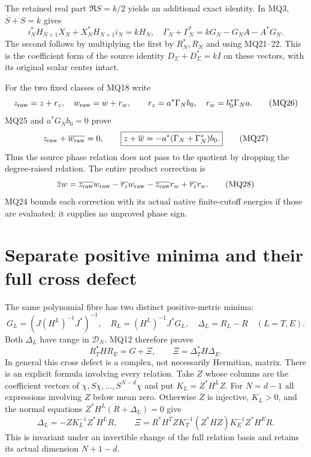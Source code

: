 \documentclass[11pt]{article}
\newcommand{\DD}{\mathcal D}
\begin{document}
The retained real part $\Re S=k/2$ yields an additional exact
identity. In MQ3, $\overline S+S=k$ gives
\[
 i_N^*H_{N+1}X_N+X_N^*H_{N+1}i_N=kH_N,
 \quad
 \boxed{\Gamma_N+\Gamma_N^*=kG_N-G_NA-A^*G_N.}              \tag{MQ25}
\]
The second follows by multiplying the first by $R_N^*,R_N$ and
using MQ21--22. This is the coefficient form of the source identity
$D_\Sigma+D_\Sigma^*=kI$ on these vectors, with its original
scalar center intact.

For the two fixed classes of MQ18 write
\[
 z_{\rm raw}=z+r_z,\quad w_{\rm raw}=w+r_w,\qquad
 r_z=a^*\Gamma_Nb_0,\quad r_w=b_0^*\Gamma_Na.                \tag{MQ26}
\]
MQ25 and $a^*G_Nb_0=0$ prove
\[
 z_{\rm raw}+\overline{w_{\rm raw}}=0,\qquad
 \boxed{z+\overline w=-a^*(\Gamma_N+\Gamma_N^*)b_0.}         \tag{MQ27}
\]
Thus the source phase relation does not pass to the quotient by
dropping the degree-raised relation. The entire product correction is
\[
 \overline zw=\overline{z_{\rm raw}}w_{\rm raw}
     -\overline{r_z}w_{\rm raw}
     -\overline{z_{\rm raw}}r_w+\overline{r_z}r_w.            \tag{MQ28}
\]
MQ24 bounds each correction with its actual native finite-cutoff
energies if those are evaluated; it supplies no unproved phase sign.

\section{Separate positive minima and their full cross defect}
The same polynomial fibre has two distinct positive-metric minima:
\[
 G_L=(J(H^L)^{-1}J^*)^{-1},\quad
 R_L=(H^L)^{-1}J^*G_L,\quad \Delta_L=R_L-R\quad(L=T,E).
                                                               \tag{MQ29}
\]
Both $\Delta_L$ have range in $\DD_N$. MQ12 therefore proves
\[
 R_T^*HR_E=G+\Xi,\qquad
 \boxed{\Xi=\Delta_T^*H\Delta_E.}                           \tag{MQ30}
\]
In general this cross defect is a complex, not necessarily Hermitian,
matrix. There is an explicit formula involving every relation.
Take $Z$ whose columns are the coefficient vectors of
$\chi,S\chi,\ldots,S^{N-d}\chi$ and put $K_L=Z^*H^LZ$.
For $N=d-1$ all expressions involving $Z$ below mean zero.
Otherwise $Z$ is injective, $K_L>0$, and the normal equations
$Z^*H^L(R+\Delta_L)=0$ give
\[
 \Delta_L=-ZK_L^{-1}Z^*H^LR,\qquad
 \Xi=R^*H^TZK_T^{-1}(Z^*HZ)K_E^{-1}Z^*H^ER.                \tag{MQ31}
\]
This is invariant under an invertible change of the full relation
basis and retains its actual dimension $N+1-d$.
\end{document}
